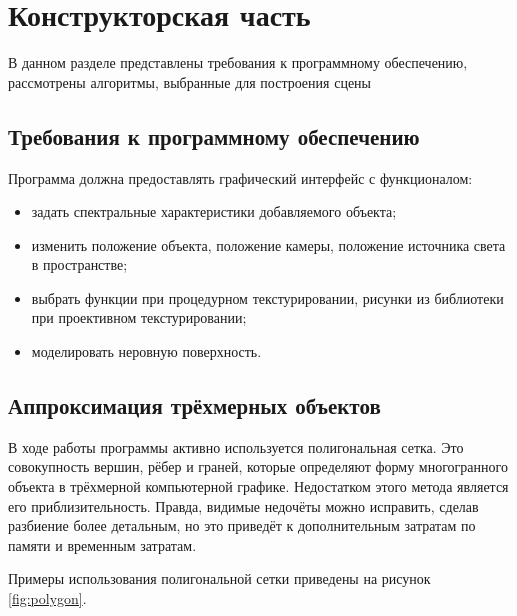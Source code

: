 \section{Конструкторская часть}
В данном разделе представлены требования к программному обеспечению, рассмотрены алгоритмы, выбранные для построения сцены

\subsection{Требования к программному обеспечению}

Программа должна предоставлять графический интерфейс с функционалом:
\begin{itemize}
	\item задать спектральные характеристики добавляемого объекта;
	\item изменить положение объекта, положение камеры, положение источника света в пространстве;
	\item выбрать функции при процедурном текстурировании, рисунки из библиотеки при проективном текстурировании;
	\item моделировать неровную поверхность.
\end{itemize}

\subsection{Аппроксимация трёхмерных объектов}
В ходе работы программы активно используется полигональная сетка.
Это совокупность вершин, рёбер и граней, которые определяют форму многогранного объекта в трёхмерной компьютерной графике.
Недостатком этого метода является его приблизительность.
Правда, видимые недочёты можно исправить, сделав разбиение более детальным, но это приведёт к дополнительным затратам по памяти и временным затратам.

Примеры использования полигональной сетки приведены на рисунок \ref{fig:polygon}.

